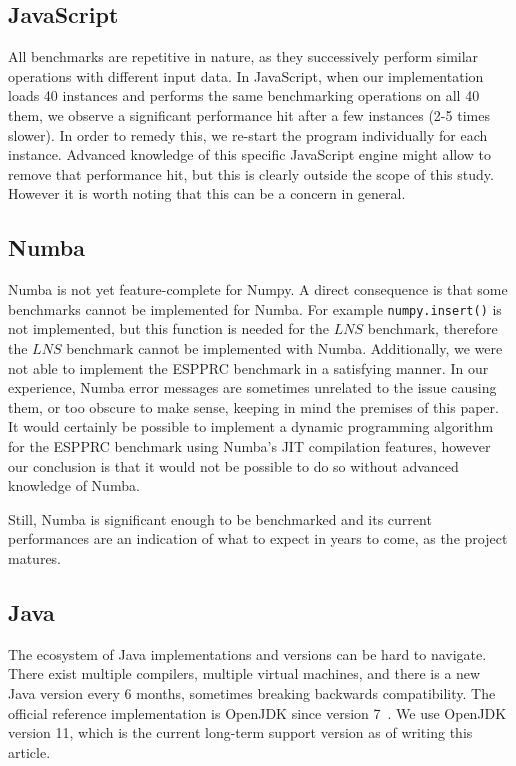 \documentclass[11pt,a4paper,notitlepage]{article}
\begin{document}


\subsection{JavaScript}
All benchmarks are repetitive in nature, as they successively perform similar
operations with different input data. In JavaScript, when our
implementation loads 40 instances and performs the same
benchmarking operations on all 40 them, we observe a significant performance
hit after a few instances (2-5 times slower). In order to remedy this,
we re-start the program individually for each instance. Advanced
knowledge of this specific JavaScript engine might allow to remove that
performance hit, but this is clearly outside the scope of this
study. However it is worth noting that this can be a concern in general.

\subsection{Numba}
Numba is not yet feature-complete for Numpy. A direct consequence is that some
benchmarks cannot be implemented for Numba. For example
\verb|numpy.insert()| is not implemented, but this function is
needed for the $LNS$ benchmark, therefore the $LNS$ benchmark cannot be
implemented with Numba. Additionally, we were not able to implement
the ESPPRC benchmark in a satisfying manner. In our experience, Numba
error messages are sometimes unrelated to the issue causing them, or
too obscure to make sense, keeping in mind the premises of this
paper. It would certainly be possible to implement a dynamic
programming algorithm for the ESPPRC benchmark using Numba's JIT
compilation features, however our conclusion is that it would not be
possible to do so without advanced knowledge of Numba.

Still, Numba is significant enough to be
benchmarked and its current performances are an indication of what to
expect in years to come, as the project matures.

\subsection{Java}
The ecosystem of Java implementations and versions can be hard to
navigate. There exist multiple compilers, multiple virtual
machines, and there is a new Java version every 6 months, sometimes
breaking backwards compatibility. The official reference
implementation is OpenJDK since version 7~\cite{openjdk-reference}.
We use OpenJDK version 11, which is the current long-term support version as
of writing this article.
\end{document}
